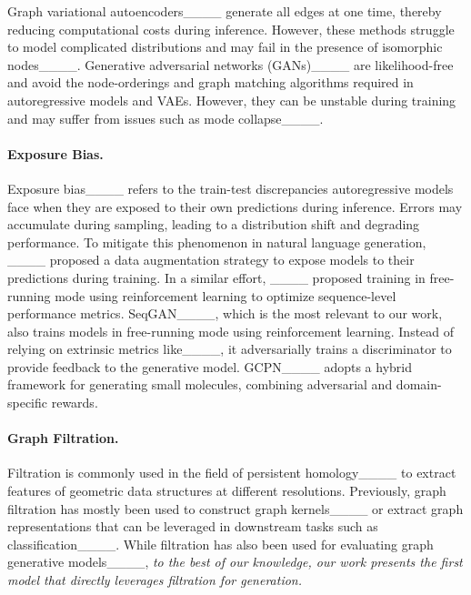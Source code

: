 Graph variational autoencoders____ generate all edges at one time, thereby reducing computational costs during inference. However, these methods struggle to model complicated distributions and may fail in the presence of isomorphic nodes____.
Generative adversarial networks (GANs)____ are likelihood-free and avoid the node-orderings and graph matching algorithms required in autoregressive models and VAEs. However, they can be unstable during training and may suffer from issues such as mode collapse____.

\paragraph{Exposure Bias.} Exposure bias____ refers to the train-test discrepancies autoregressive models face when they are exposed to their own predictions during inference. Errors may accumulate during sampling, leading to a distribution shift and degrading performance. To mitigate this phenomenon in natural language generation, ____ proposed a data augmentation strategy to expose models to their predictions during training. In a similar effort, ____ proposed training in free-running mode using reinforcement learning to optimize sequence-level performance metrics. SeqGAN____, which is the most relevant to our work, also trains models in free-running mode using reinforcement learning. Instead of relying on extrinsic metrics like____, it adversarially trains a discriminator to provide feedback to the generative model. GCPN____ adopts a hybrid framework for generating small molecules, combining adversarial and domain-specific rewards.

\paragraph{Graph Filtration.} %
Filtration is commonly used in the field of persistent homology____ to extract features of geometric data structures at different resolutions. Previously, graph filtration has mostly been used to construct graph kernels____ or extract graph representations that can be leveraged in downstream tasks such as classification____. While filtration has also been used for evaluating graph generative models____, \emph{to the best of our knowledge, our work presents the first model that directly leverages filtration for generation.}